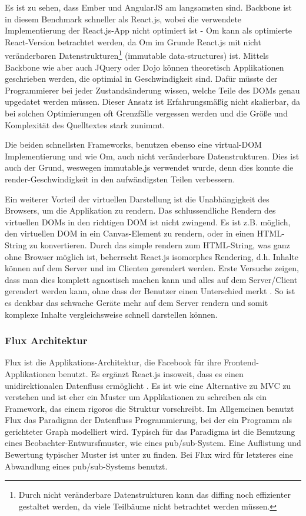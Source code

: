 \documentclass[12pt,twoside]{book}
\begin{document}
Es ist zu sehen, dass Ember und AngularJS am langsamsten sind. Backbone ist in diesem Benchmark schneller als React.js, wobei die verwendete Implementierung der React.js-App nicht optimiert ist - Om\cite{om} kann als optimierte React-Version betrachtet werden, da Om im Grunde React.js mit nicht veränderbaren Datenstrukturen\footnote{Durch nicht veränderbare Datenstrukturen kann das diffing noch effizienter gestaltet werden, da viele Teilbäume nicht betrachtet werden müssen.} (immutable data-structures) ist. Mittels Backbone wie aber auch JQuery oder Dojo können theoretisch Applikationen geschrieben werden, die optimial in Geschwindigkeit sind. Dafür müsste der Programmierer bei jeder Zustandsänderung wissen, welche Teile des DOMs genau upgedatet werden müssen. Dieser Ansatz ist Erfahrungsmäßig nicht skalierbar, da bei solchen Optimierungen oft Grenzfälle vergessen werden und die Größe und Komplexität des Quelltextes stark zunimmt.

Die beiden schnellsten Frameworks, benutzen ebenso eine virtual-DOM Implementierung und wie Om, auch nicht veränderbare Datenstrukturen.
Dies ist auch der Grund, weswegen immutable.js\cite{Immutable} verwendet wurde, denn dies konnte die render-Geschwindigkeit in den aufwändigsten Teilen verbessern.

Ein weiterer Vorteil der virtuellen Darstellung ist die Unabhängigkeit des Browsers, um die Applikation zu rendern. Das schlussendliche Rendern des virtuellen DOMs in den richtigen DOM ist nicht zwingend. Es ist z.B. möglich, den virtuellen DOM in ein Canvas-Element zu rendern, oder in einen HTML-String zu konvertieren.
Durch das simple rendern zum HTML-String, was ganz ohne Browser möglich ist, beherrscht React.js isomorphes Rendering, d.h. Inhalte können auf dem Server und im Clienten gerendert werden. Erste Versuche zeigen, dass man dies komplett agnostisch machen kann und alles auf dem Server/Client gerendert werden kann, ohne dass der Benutzer einen Unterschied merkt \cite{overblog}. So ist es denkbar das schwache Geräte mehr auf dem Server rendern und somit komplexe Inhalte vergleichsweise schnell darstellen können.

\subsubsection*{Flux Architektur}

Flux ist die Applikations-Architektur, die Facebook für ihre Frontend-Applikationen benutzt. Es ergänzt React.js insoweit, dass es einen unidirektionalen Datenfluss ermöglicht \cite{flux}. Es ist wie eine Alternative zu MVC zu verstehen und ist eher ein Muster um Applikationen zu schreiben als ein Framework, das einem rigoros die Struktur vorschreibt. Im Allgemeinen benutzt Flux das Paradigma der Datenfluss Programmierung\cite{johnston2004advances}, bei der ein Programm als gerichteter Graph modelliert wird. Typisch für das Paradigma ist die Benutzung eines Beobachter-Entwursfmuster, wie eines pub/sub-System. Eine Auflistung und Bewertung typischer Muster ist unter \citep{signals} zu finden. Bei Flux wird für letzteres eine Abwandlung eines pub/sub-Systems benutzt.
\end{document}
